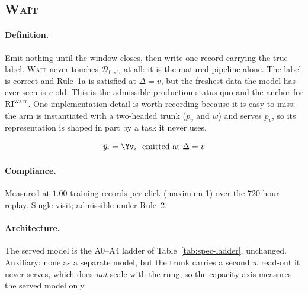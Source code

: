 \subsection{\textsc{Wait}}\label{app:m-DISTILL-T}

\paragraph{Definition.} Emit nothing until the window closes, then write one record carrying the true label.
   \textsc{Wait} never touches $\mathcal{D}_{\text{fresh}}$ at all: it is the matured pipeline
   alone. The label is correct and Rule~1a is satisfied at $\Delta=v$, but the freshest data the
   model has ever seen is $v$ old. This is the admissible production status quo and the anchor for
   $\mathrm{RI}^{\textsc{wait}}$. One implementation detail is worth recording because it is easy
   to miss: the arm is instantiated with a two-headed trunk ($p_v$ and $w$) and serves $p_v$, so
   its representation is shaped in part by a task it never uses.

\begin{equation}
\tilde y_i = \Yv_i \ \text{ emitted at } \Delta=v
\end{equation}

\begin{center}\end{center}

\paragraph{Compliance.} Measured at $1.00$ training records per click (maximum 1) over the 720-hour replay. Single-visit; admissible under Rule~2.

\paragraph{Architecture.} The served model is the A0--A4 ladder of Table~\ref{tab:spec-ladder}, unchanged. Auxiliary: none as a separate model, but the trunk carries a second $w$ read-out it never serves, which does \emph{not} scale with the rung, so the capacity axis measures the served model only.

